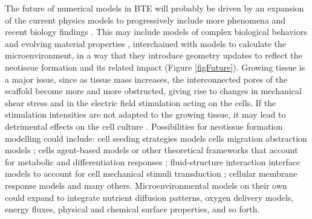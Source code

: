 The future of numerical models in \acs{BTE} will probably be driven by an expansion of the current physics models to progressively include more phenomena and recent biology findings \cite{Moller2021-kr}. This may include models of complex biological behaviors and evolving material properties \cite{Metz2020-vr}, interchained with models to calculate the microenvironment, in a way that they introduce geometry updates to reflect the neotissue formation and its related impact (Figure \ref{figFuture}). Growing tissue is a major issue, since as tissue mass increases, the interconnected pores of the scaffold become more and more obstructed, giving rise to changes in mechanical shear stress and in the electric field stimulation acting on the cells. If the stimulation intensities are not adapted to the growing tissue, it may lead to detrimental effects on the cell culture \cite{Vetsch2015-xz}. Possibilities for neotissue formation modelling could include: cell seeding strategies models \cite{Coy2020-st, Nguyen2018-dq, Taghian2015-hf} cells migration abstraction models \cite{Colombi2021-ow}; cells agent-based models or other theoretical frameworks that account for metabolic and differentiation responses \cite{Lopez2019-qj, Dawson2020-mo}; fluid-structure interaction interface models to account for cell mechanical stimuli transduction \cite{Vaughan2013-gj}; cellular membrane response \cite{Gschwend2020-ep} models and many others. Microenvironmental models on their own could expand to integrate nutrient diffusion patterns, oxygen delivery models, energy fluxes, physical and chemical surface properties, and so forth.

